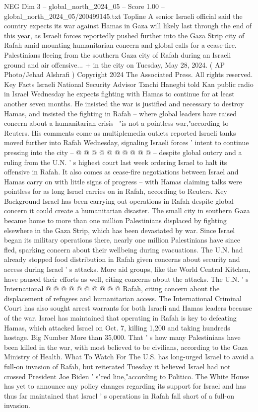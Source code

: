 \begin{textsample}{NEG Dim 3 – global\_north\_2024\_05 – Score 1.00 – global\_north\_2024\_05/200499145.txt}  \label{ex:f3_neg_439}
Topline A senior Israeli official said the country expects its war against Hamas in Gaza will likely last through the end of this year, as Israeli forces reportedly pushed further into the Gaza Strip city of Rafah amid mounting humanitarian concern and global calls for a cease-fire.
Palestinians fleeing from the southern Gaza city of Rafah during an Israeli ground and air offensive... + in the city on Tuesday, May 28, 2024. ( AP Photo/Jehad Alshrafi ) Copyright 2024 The Associated Press.
All rights reserved.
Key Facts Israeli National Security Advisor Tzachi Hanegbi told Kan public radio in Israel Wednesday he expects fighting with Hamas to continue for at least another seven months.
He insisted the war is justified and necessary to destroy Hamas, and insisted the fighting in Rafah -- where global leaders have raised concern about a humanitarian crisis --"is not a pointless war,"according to Reuters.
His comments come as multiplemedia outlets reported Israeli tanks moved further into Rafah Wednesday, signaling Israeli forces ' intent to continue pressing into the city -- @ @ @ @ @ @ @ @ @ @ -- despite global outcry and a ruling from the U.N. ' s highest court last week ordering Israel to halt its offensive in Rafah.
It also comes as cease-fire negotiations between Israel and Hamas carry on with little signs of progress -- with Hamas claiming talks were pointless for as long Israel carries on in Rafah, according to Reuters.
Key Background Israel has been carrying out operations in Rafah despite global concern it could create a humanitarian disaster.
The small city in southern Gaza became home to more than one million Palestinians displaced by fighting elsewhere in the Gaza Strip, which has been devastated by war.
Since Israel began its military operations there, nearly one million Palestinians have since fled, sparking concern about their wellbeing during evacuations.
The U.N. had already stopped food distribution in Rafah given concerns about security and access during Israel ' s attacks.
More aid groups, like the World Central Kitchen, have paused their efforts as well, citing concerns about the attacks.
The U.N. ' s International @ @ @ @ @ @ @ @ @ @ Rafah, citing concern about the displacement of refugees and humanitarian access.
The International Criminal Court has also sought arrest warrants for both Israeli and Hamas leaders because of the war.
Israel has maintained that operating in Rafah is key to defeating Hamas, which attacked Israel on Oct. 7, killing 1,200 and taking hundreds hostage.
Big Number More than 35,000.
That ' s how many Palestinians have been killed in the war, with most believed to be civilians, according to the Gaza Ministry of Health.
What To Watch For The U.S. has long-urged Israel to avoid a full-on invasion of Rafah, but reiterated Tuesday it believed Israel had not crossed President Joe Biden ' s"red line,"according to Politico.
The White House has yet to announce any policy changes regarding its support for Israel and has thus far maintained that Israel ' s operations in Rafah fall short of a full-on invasion.

\end{textsample}
